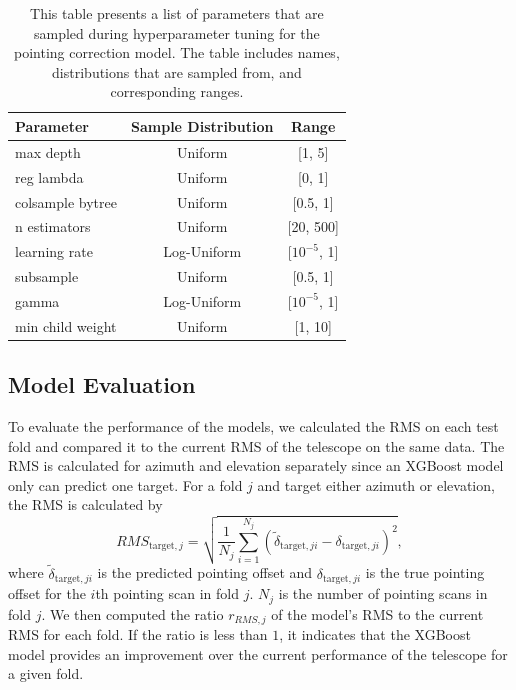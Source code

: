 \begin{table}[H]
    \centering
    \caption{This table presents a list of parameters that are sampled during hyperparameter tuning for the pointing correction model. The table includes names, distributions that are sampled from, and corresponding ranges.}
    \begin{tabular}{lcc}
        \hline
        \textbf{Parameter} & \textbf{Sample Distribution} & \textbf{Range} \\ \hline
        max depth & Uniform & [1, 5] \\ 
        reg lambda & Uniform & [0, 1] \\ 
        colsample bytree & Uniform & [0.5, 1] \\ 
        n estimators & Uniform & [20, 500] \\ 
        learning rate & Log-Uniform & [$10^{-5}$, 1] \\ 
        subsample & Uniform & [0.5, 1] \\ 
        gamma & Log-Uniform & [$10^{-5}$, 1] \\ 
        min child weight & Uniform & [1, 10] \\ 
        \hline
    \end{tabular}
    \label{tab:xgb_hyperparameters_pcorr}
\end{table}



\subsection{Model Evaluation}
To evaluate the performance of the models, we calculated the RMS on each test fold and compared it to the current RMS of the telescope on the same data.
The RMS is calculated for azimuth and elevation separately since an XGBoost model only can predict one target.
For a fold $j$ and target either azimuth or elevation, the RMS is calculated by
\begin{equation}
    RMS_{\text{target},j} = \sqrt{\frac{1}{N_j}\sum_{i=1}^{N_j} (\tilde{\delta}_{\text{target},ji} - \delta_{\text{target},ji})^2},
\end{equation}
where $\tilde{\delta}_{\text{target},ji}$ is the predicted pointing offset and $\delta_{\text{target},ji}$ is the true pointing offset for the $i$th pointing scan in fold $j$.
$N_j$ is the number of pointing scans in fold $j$. 
We then computed the ratio $r_{RMS,j}$ of the model's RMS to the current RMS for each fold.
If the ratio is less than $1$, it indicates that the XGBoost model provides an improvement over the current performance of the telescope for a given fold.

